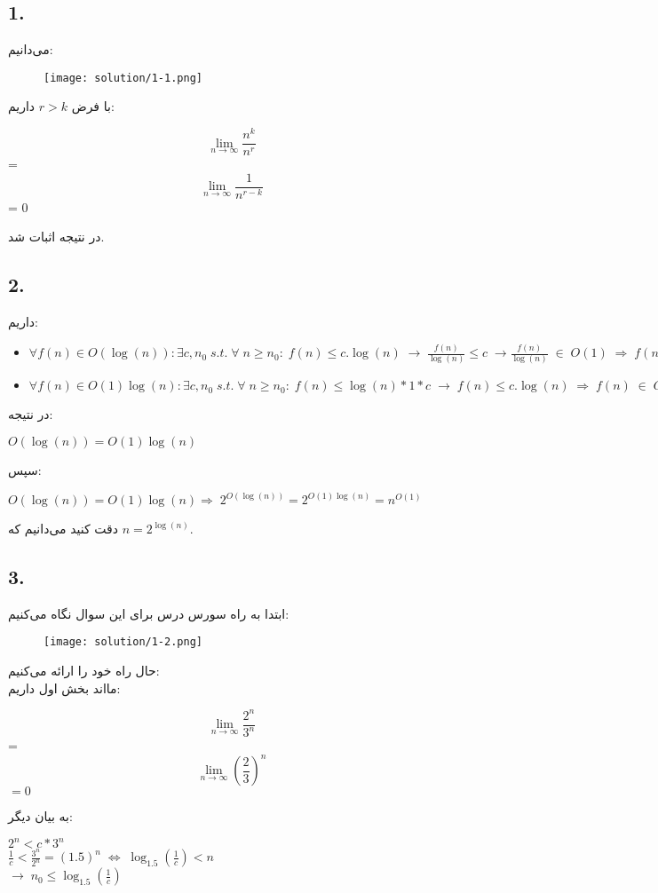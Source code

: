 \subsection*{1.}
می‌دانیم:
\begin{figure}[H]
    \centering
    \texttt{[image: solution/1-1.png]}
\end{figure}

با فرض 
$r > k$ داریم:
\begin{center}
    \[ \lim_{n\to\infty} \frac{n^k}{n^r} \]  =  \[ \lim_{n\to\infty} \frac{1}{n^{r-k}} \]  =
    0
\end{center}
در نتیجه اثبات شد.

\subsection*{2.}
داریم:
\begin{center}
    \begin{itemize}
        \item 
        $\forall f(n) \in  O(\log(n)): 
        \exists c, n_0\; s.t.\; \forall \; n \geq n_0:\; f(n) \leq 
        c.\log(n)\; \rightarrow \; \frac{f(n)}{\log(n)} \leq c
        \; \rightarrow \frac{f(n)}{\log(n)}\;\in\; O(1)\;
        \Longrightarrow \; f(n)\;\in\; O(1)\log(n)$ 
        \item 
        $\forall f(n) \in O(1)\log(n): 
        \exists c, n_0\; s.t.\; \forall \; n \geq n_0:\; f(n) \leq 
        \log(n)*1*c\; \rightarrow \; f(n) \leq c.\log(n)\;
        \Longrightarrow \; f(n)\;\in\;O(\log(n))$
    \end{itemize}
\end{center}
در نتیجه:
\begin{center}
    $O(\log(n)) = O(1)\log(n)$
\end{center}
سپس:
\begin{center}
    $O(\log(n)) = O(1)\log(n) \Longrightarrow\;
    2^{O(\log(n))} = 2^{O(1)\log(n)} = n^{O(1)}$
\end{center}
دقت کنید می‌دانیم که 
$n = 2^{\log(n)}$.

\subsection*{3. }
ابتدا به راه سورس درس برای این سوال نگاه می‌کنیم:
\begin{figure}[H]
    \centering
    \texttt{[image: solution/1-2.png]}
\end{figure}
حال راه خود را ارائه می‌کنیم:\\
مااند بخش اول داریم:
\begin{center}
    \[ \lim_{n\to\infty} \frac{2^n}{3^n} \] = \[ \lim_{n\to\infty} (\frac{2}{3})^n \] $= 0$
\end{center}
به بیان دیگر:
\begin{center}
    $2^n < c * 3^n$\\
    $\frac{1}{c} < \frac{3^n}{2^n} = (1.5)^n  \;\Leftrightarrow\;
    \log_{1.5}(\frac{1}{c}) < n$\\
    $\rightarrow \; n_0 \leq \log_{1.5}(\frac{1}{c})$ \\
\end{center}